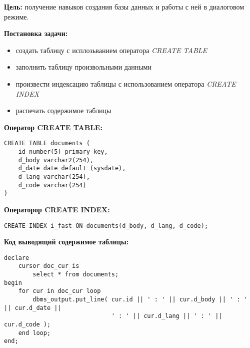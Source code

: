 \documentclass[pscyr, 12pt]{hedlab}
\begin{document}
    \makeheader
    \noindent\textbf{Цель:} получение навыков создания базы данных и работы с ней в диалоговом режиме.

    \noindent\textbf{Постановка задачи:}
    \vspace*{-1em}
    \begin{itemize}\itemsep-5pt
        \item создать таблицу с исплозьванием оператора \emph{CREATE TABLE}
        \item заполнить таблицу произвольными данными
        \item произвести индексацию таблицы с использованием оператора \emph{CREATE INDEX}
        \item распечать содержимое таблицы
    \end{itemize}
  
    \noindent\textbf{Оператор CREATE TABLE:}
    \begin{lstlisting}
CREATE TABLE documents (
    id number(5) primary key,
    d_body varchar2(254),
    d_date date default (sysdate),
    d_lang varchar(254),
    d_code varchar(254)
)
    \end{lstlisting}

    \noindent\textbf{Операторор CREATE INDEX:}
    \begin{lstlisting}
CREATE INDEX i_fast ON documents(d_body, d_lang, d_code);
    \end{lstlisting}

    \noindent\textbf{Код выводящий содержимое таблицы:}
    \begin{lstlisting}
declare
    cursor doc_cur is        
        select * from documents;
begin
    for cur in doc_cur loop
        dbms_output.put_line( cur.id || ' : ' || cur.d_body || ' : ' || cur.d_date || 
                              ' : ' || cur.d_lang || ' : ' || cur.d_code );
    end loop;
end;
    \end{lstlisting}

    \newpage
\end{document}
